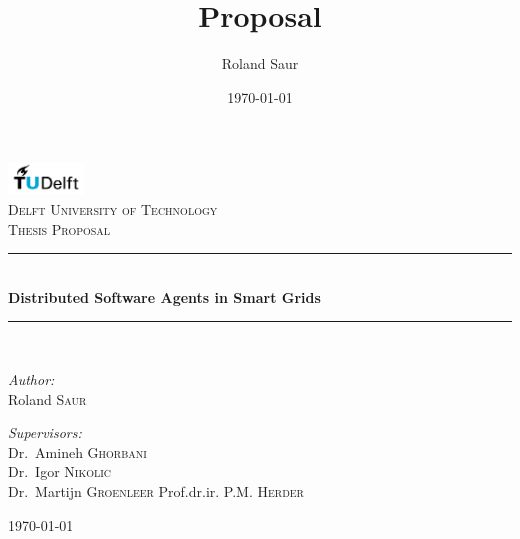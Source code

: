 \documentclass[a4paper]{article}
\title{Proposal}
\author{Roland Saur}
\date{\today}
\begin{document}
\begin{titlepage}

\begin{center}


\includegraphics[width=0.15\textwidth]{tud.png}\\[1cm]    

\textsc{\LARGE Delft University of Technology}\\[1.5cm]

\textsc{\Large Thesis Proposal}\\[0.5cm]


\newcommand{\HRule}{\rule{\linewidth}{0.5mm}}
\HRule \\[0.4cm]
{ \huge \bfseries Distributed Software Agents in Smart Grids}\\[0.4cm]

\HRule \\[1.5cm]

\begin{minipage}{0.4\textwidth}
\begin{flushleft} \large
\emph{Author:}\\
Roland \textsc{Saur}
\end{flushleft}
\end{minipage}
\hfill
\begin{minipage}{0.4\textwidth}
\begin{flushright} \large
\emph{Supervisors:} \\
Dr.~Amineh \textsc{Ghorbani} \\
Dr.~Igor \textsc{Nikolic} \\
Dr.~Martijn \textsc{Groenleer}
Prof.dr.ir. P.M. \textsc{Herder}  \\

\end{flushright}
\end{minipage}

\vfill

{\large \today}

\end{center}

\end{titlepage}
\newpage
\tableofcontents
\newpage
\end{document}
